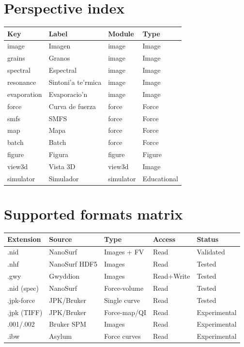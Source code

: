\documentclass[a4paper,11pt]{article}
\begin{document}
\section{Perspective index}

\begin{longtable}{@{}>{\ttfamily}l l l l@{}}
\toprule
Key & Label & Module & Type \\
\midrule
image & Imagen & image & Image \\
grains & Granos & image & Image \\
spectral & Espectral & image & Image \\
resonance & Sintoni'a te'rmica & image & Image \\
evaporation & Evaporacio'n & image & Image \\
force & Curva de fuerza & force & Force \\
smfs & SMFS & force & Force \\
map & Mapa & force & Force \\
batch & Batch & force & Force \\
figure & Figura & figure & Figure \\
view3d & Vista 3D & view3d & Image \\
simulator & Simulador & simulator & Educational \\
\bottomrule
\end{longtable}

\section{Supported formats matrix}

\begin{longtable}{@{}l l l l l@{}}
\toprule
Extension & Source & Type & Access & Status \\
\midrule
.nid & NanoSurf & Images + FV & Read & Validated \\
.nhf & NanoSurf HDF5 & Images & Read & Tested \\
.gwy & Gwyddion & Images & Read+Write & Tested \\
.nid (spec) & NanoSurf & Force-volume & Read & Tested \\
.jpk-force & JPK/Bruker & Single curve & Read & Tested \\
.jpk (TIFF) & JPK/Bruker & Force-map/QI & Read & Experimental \\
.001/.002 & Bruker SPM & Images & Read & Experimental \\
.ibw & Asylum & Force curves & Read & Experimental \\
\bottomrule
\end{longtable}
\end{document}
